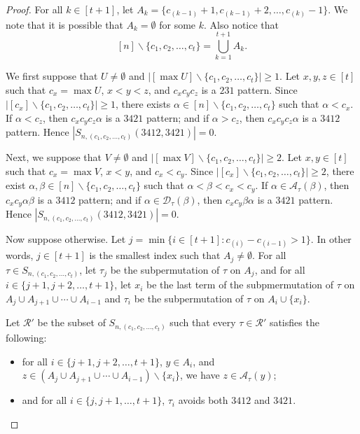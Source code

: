 \documentclass[10pt,a4paper]{amsart}
\begin{document}
\begin{proof}
    For all $k\in[t+1]$, let $A_k=\{c_{(k-1)}+1,c_{(k-1)}+2,\ldots,c_{(k)}-1\}$. We note that it is possible that $A_k=\emptyset$ for some $k$. Also notice that
    \[
[n]\backslash\{c_1,c_2,\ldots,c_t\}=\bigcup_{k=1}^{t+1}A_k.
\]


We first suppose that $U\neq\emptyset$ and $\left|[\max U]\backslash\{c_1,c_2,\ldots,c_t\}\right|\geq1$. Let $x,y,z\in[t]$ such that $c_x=\max U$, $x<y<z$, and $c_xc_yc_z$ is a $231$ pattern. Since $\left|[c_x]\backslash\{c_1,c_2,\ldots,c_t\}\right|\geq1$, there exists $\alpha\in [n]\backslash\{c_1,c_2,\ldots,c_t\}$ such that $\alpha<c_x$. If $\alpha<c_z$, then $c_xc_yc_z\alpha$ is a $3421$ pattern; and if $\alpha>c_z$, then $c_xc_yc_z\alpha$ is a $3412$ pattern. Hence $|S_{n,(c_1,c_2,\ldots,c_t)}(3412,3421)|=0$.

Next, we suppose that $V\neq\emptyset$ and $\left|[\max V]\backslash\{c_1,c_2,\ldots,c_t\}\right|\geq2$. Let $x,y\in[t]$ such that $c_x=\max V$, $x<y$, and $c_x<c_y$. Since $\left|[c_x]\backslash\{c_1,c_2,\ldots,c_t\}\right|\geq2$, there exist $\alpha,\beta\in[n]\backslash\{c_1,c_2,\ldots,c_t\}$ such that $\alpha<\beta<c_x<c_y$. If $\alpha\in\mathcal{A}_\tau(\beta)$, then $c_xc_y\alpha\beta$ is a $3412$ pattern; and if $\alpha\in\mathcal{D}_\tau(\beta)$, then $c_xc_y\beta\alpha$ is a $3421$ pattern. Hence $|S_{n,(c_1,c_2,\ldots,c_t)}(3412,3421)|=0$.

Now suppose otherwise. Let $j=\min\{i\in[t+1]:c_{(i)}-c_{(i-1)}>1\}$. In other words, $j\in[t+1]$ is the smallest index such that $A_j\neq\emptyset$. For all $\tau\in S_{n,(c_1,c_2,\ldots,c_t)}$, let $\tau_j$ be the subpermutation of $\tau$ on $A_j$, and for all $i\in\{j+1,j+2,\ldots,t+1\}$, let $x_i$ be the last term of the subpmermutation of $\tau$ on $A_j\cup A_{j+1}\cup\cdots \cup A_{i-1}$ and $\tau_i$ be the subpermutation of $\tau$ on $A_i\cup\{x_i\}$.
    
    Let $\mathcal{R}'$ be the subset of $S_{n,(c_1,c_2,\ldots,c_t)}$ such that every $\tau\in\mathcal{R}'$ satisfies the following:
    \begin{itemize}
        \item[(i)] for all $i\in\{j+1,j+2,\ldots,t+1\}$, $y\in A_i$, and $z\in (A_j\cup A_{j+1}\cup\cdots \cup A_{i-1})\backslash\{x_i\}$, we have $z\in\mathcal{A}_\tau(y)$;
        \item[(ii)] and for all $i\in\{j,j+1,\ldots,t+1\}$, $\tau_i$ avoids both $3412$ and $3421$.
    \end{itemize}
    

\end{proof}
\end{document}

